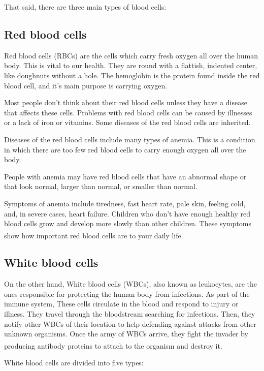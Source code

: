 That said, there are three main types of blood cells:

\subsection{Red blood cells}

Red blood cells (RBCs) are the cells which carry fresh oxygen all over the human body. This is vital to our health. They are round with a flattish, indented center, like doughnuts without a hole. 
The hemoglobin is the protein found inside the red blood cell, and it's main purpose is carrying oxygen.

Most people don't think about their red blood cells unless they have a disease that affects these cells. Problems with red blood cells can be caused by illnesses or a lack of iron or vitamins. Some diseases of the red blood cells are inherited.

Diseases of the red blood cells include many types of anemia. This is a condition in which there are too few red blood cells to carry enough oxygen all over the body.

People with anemia may have red blood cells that have an abnormal shape or that look normal, larger than normal, or smaller than normal.

Symptoms of anemia include tiredness, fast heart rate, pale skin, feeling cold, and, in severe cases, heart failure. Children who don't have enough healthy red blood cells grow and develop more slowly than other children. These symptoms show how important red blood cells are to your daily life. \textsuperscript{\cite{RBC-urmcrochester}}

\subsection{White blood cells}

On the other hand, White blood cells (WBCs), also known as leukocytes, are the ones responsible for protecting the human body from infections. As part of the immune system, These cells circulate in the blood and respond to injury or illness. They travel through the bloodstream searching for infections. Then, they notify other WBCs of their location to help defending against attacks from other unknown organisms. Once the army of WBCs arrive, they fight the invader by producing antibody proteins to attach to the organism and destroy it. \textsuperscript{\cite{WBC-clevelandclinic}}

White blood cells are divided into five types:

